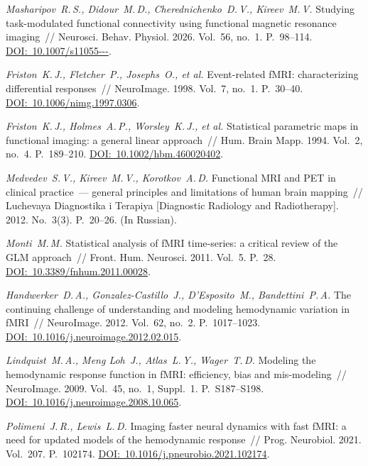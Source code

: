 \begin{ltrtr}
	\textit{Masharipov~R.\,S., Didour~M.\,D., Cherednichenko~D.\,V., Kireev~M.\,V.} Studying task-modulated functional connectivity using functional magnetic resonance imaging~// Neurosci. Behav. Physiol. 2026. Vol.~56, no.~1. P.~98--114. \href{https://doi.org/10.1007/s11055-026-01954-9}{DOI:~10.1007/\allowbreak s11055---}.

	\textit{Friston~K.\,J., Fletcher~P., Josephs~O., et al.} Event-related fMRI: characterizing differential responses~// NeuroImage. 1998. Vol.~7, no.~1. P.~30--40. \href{https://doi.org/10.1006/nimg.1997.0306}{DOI:~10.1006/\allowbreak nimg.1997.0306}.

	\textit{Friston~K.\,J., Holmes~A.\,P., Worsley~K.\,J., et al.} Statistical parametric maps in functional imaging: a general linear approach~// Hum. Brain Mapp. 1994. Vol.~2, no.~4. P.~189--210. \href{https://doi.org/10.1002/hbm.460020402}{DOI:~10.1002/\allowbreak hbm.460020402}.

	\textit{Medvedev~S.\,V., Kireev~M.\,V., Korotkov~A.\,D.} Functional MRI and PET in clinical practice~--- general principles and limitations of human brain mapping~// Luchevaya Diagnostika i Terapiya [Diagnostic Radiology and Radiotherapy]. 2012. No.~3(3). P.~20--26. (In Russian).

	\textit{Monti~M.\,M.} Statistical analysis of fMRI time-series: a critical review of the GLM approach~// Front. Hum. Neurosci. 2011. Vol.~5. P.~28. \href{https://doi.org/10.3389/fnhum.2011.00028}{DOI:~10.3389/\allowbreak fnhum.2011.00028}.

	\textit{Handwerker~D.\,A., Gonzalez-Castillo~J., D'Esposito~M., Bandettini~P.\,A.} The continuing challenge of understanding and modeling hemodynamic variation in fMRI~// NeuroImage. 2012. Vol.~62, no.~2. P.~1017--1023. \href{https://doi.org/10.1016/j.neuroimage.2012.02.015}{DOI:~10.1016/\allowbreak j.neuroimage.2012.02.015}.

	\textit{Lindquist~M.\,A., Meng Loh~J., Atlas~L.\,Y., Wager~T.\,D.} Modeling the hemodynamic response function in fMRI: efficiency, bias and mis-modeling~// NeuroImage. 2009. Vol.~45, no.~1, Suppl.~1. P.~S187--S198. \href{https://doi.org/10.1016/j.neuroimage.2008.10.065}{DOI:~10.1016/\allowbreak j.neuroimage.2008.10.065}.

	\textit{Polimeni~J.\,R., Lewis~L.\,D.} Imaging faster neural dynamics with fast fMRI: a need for updated models of the hemodynamic response~// Prog. Neurobiol. 2021. Vol.~207. P.~102174. \href{https://doi.org/10.1016/j.pneurobio.2021.102174}{DOI:~10.1016/\allowbreak j.pneurobio.2021.102174}.


\end{ltrtr}
